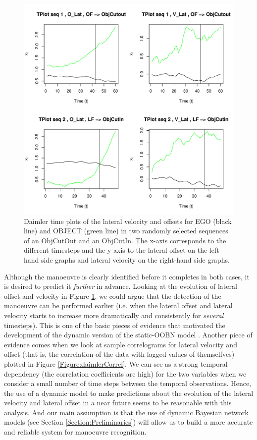 \begin{figure}
\begin{center}
\includegraphics[scale=0.65]{./figures/DaimlerLE_EGO_L_LE_OBJ_L_OBJCut.pdf}
\caption{\label{Figure:daimlerTPlot}Daimler time plots of the lateral velocity and offsets for EGO (black line) and OBJECT (green line) in two randomly selected sequences of an ObjCutOut and an ObjCutIn. The x-axis corresponds to the different timesteps and the y-axis to the lateral offset on the left-hand side graphs and lateral velocity on the right-hand side graphs.}
\end{center}
\end{figure}


Although the manoeuvre is clearly identified before it completes in both cases, it is desired to predict it \textit{further} in advance. Looking at the evolution of lateral offset and velocity in Figure \ref{Figure:daimlerTPlot}, we could argue that the detection of the manoeuvre can be performed earlier (i.e. when the lateral offset and lateral velocity starts to increase more dramatically and consistently for \textit{several} timesteps). This is one of the basic pieces of evidence that motivated the development of the dynamic version of the static-OOBN model \cite{Weidl2014}.  Another piece of evidence comes when we look at sample correlograms for lateral velocity and offset (that is, the correlation of the data with lagged values of themselfves) plotted in Figure \ref{Figure:daimlerCorrel}. We can see as a strong temporal dependency (the correlation coefficients are high) for the two variables when we consider a small number of time steps between the temporal observations. Hence, the use of a dynamic model to make predictions about the evolution of the lateral velocity and lateral offset in a near future seems to be reasonable with this analysis. And our main assumption is that the use of dynamic Bayesian network models (see Section \ref{Section:Preliminaries}) will allow us to build a more accurate and reliable system for manoeuvre recognition. 

